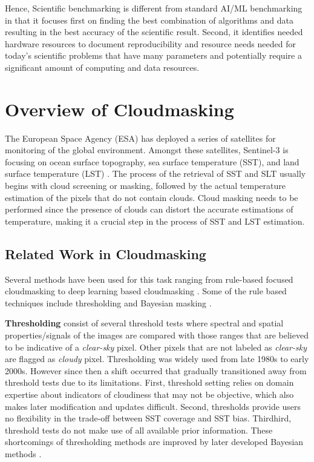 \documentclass[sigplan,screen]{acmart}
\begin{document}
Hence, Scientific benchmarking is different from standard AI/ML benchmarking in that it focuses first on finding the best combination of algorithms and data resulting in the best accuracy of the scientific result. Second, it identifies needed hardware resources to document reproducibility and resource needs needed for today's scientific problems that have many parameters and potentially require a significant amount of computing and data resources. 


\section{Overview of Cloudmasking}

The European Space Agency (ESA) has deployed a series of satellites for monitoring of the global environment. Amongst these satellites, Sentinel-3 is focusing on ocean surface topography, sea surface temperature (SST), and land surface temperature (LST) \cite{www-sentinal-3}. The process of the retrieval of SST and SLT usually begins with cloud screening or masking, followed by the actual temperature estimation of the pixels that do not contain clouds. Cloud masking needs to be performed since the presence of clouds can distort the accurate estimations of temperature, making it a crucial step in the process of SST and LST estimation.

\subsection{Related Work in Cloudmasking}
\label{sec:related}

Several methods have been used for this task ranging from rule-based focused cloudmasking to deep learning based cloudmasking \cite{WIELAND2019111203,Yan2018CloudAC}.  Some of the rule based techniques include thresholding \cite{Saunders1986AnAS,Saunders1988AnIM} and Bayesian masking \cite{Merchant2005ProbabilisticPB}. 

{\bf Thresholding} consist of several threshold tests where spectral and spatial properties/signals of the images are compared with those ranges that are believed to be indicative of a {\em clear-sky} pixel. Other pixels that are not labeled as {\em clear-sky} are flagged as {\em cloudy} pixel. Thresholding was widely used from late 1980s to early 2000s. However since then a shift occurred that gradually transitioned away from threshold tests due to its limitations. First, threshold setting relies on domain expertise about indicators of cloudiness that may not be objective, which also makes later modification and updates difficult. Second, thresholds provide users no flexibility in the trade-off between SST coverage and SST bias. Thirdhird, threshold tests do not make use of all available prior information. These shortcomings of thresholding methods are improved by later developed Bayesian methods  \cite{???}.
\end{document}
